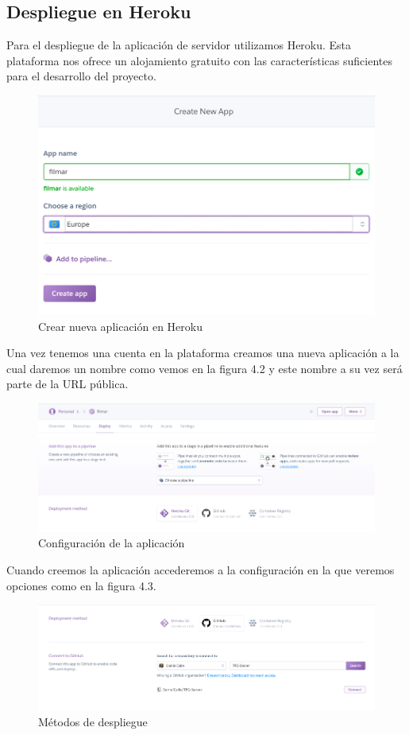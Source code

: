 \subsection{Despliegue en Heroku}
\label{makereference4.2.1}
Para el despliegue de la aplicación de servidor utilizamos Heroku. Esta plataforma nos ofrece un alojamiento gratuito con las características suficientes para el desarrollo del proyecto.
\begin{figure}[H]
    \centering
    \includegraphics[width=6in]{figures/chapter-4/heroku_1.png}
    \caption{Crear nueva aplicación en Heroku}
\end{figure}
Una vez tenemos una cuenta en la plataforma creamos una nueva aplicación a la cual daremos un nombre como vemos en la figura 4.2 y este nombre a su vez será parte de la URL pública.
\begin{figure}[H]
    \centering
    \includegraphics[width=6in]{figures/chapter-4/heroku_2.png}
    \caption{Configuración de la aplicación}
\end{figure}
Cuando creemos la aplicación accederemos a la configuración en la que veremos opciones como en la figura 4.3.
\begin{figure}[H]
    \centering
    \includegraphics[width=6in]{figures/chapter-4/heroku_3.png}
    \caption{Métodos de despliegue}
\end{figure}

